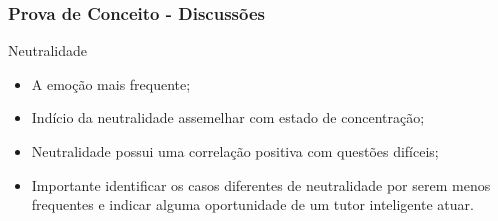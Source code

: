 \begin{frame}
\frametitle{Prova de Conceito - Discussões}
\begin{block}{Neutralidade}
\begin{itemize}
\item A emo\c{c}\~ao mais frequente;
\item Ind\'{i}cio da neutralidade assemelhar com estado de concentra\c{c}\~ao;
\item Neutralidade possui uma correla\c{c}\~ao positiva com quest\~oes dif\'{i}ceis;
\pause
\item Importante identificar os casos diferentes de neutralidade por serem menos frequentes 
e indicar alguma oportunidade de um tutor inteligente atuar.
\end{itemize}
\end{block}

\end{frame}
 
